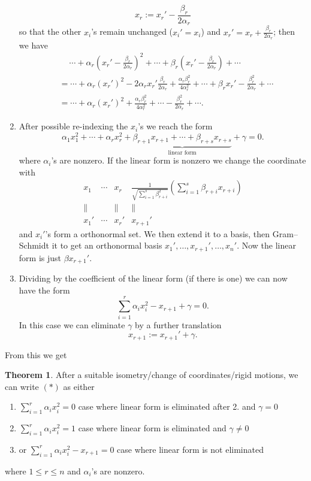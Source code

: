 \documentclass[a4paper]{article}
\theoremstyle{definition}
\newtheorem{thm}[defn]{Theorem}
\begin{document}
\begin{enumerate}
    \[
    x_r:=x_r' - \frac{\beta_r}{2\alpha_r}
    \]
    so that the other $x_i$'s remain unchanged ($x_i'=x_i$) and $x_r'=x_r+\frac{\beta_r}{2\alpha_r}$; then we have
    \[
    \begin{aligned}
    &\quad \ \cdots + \alpha_r \left(x_r' - \frac{\beta_r}{2\alpha_r}\right)^2 + \cdots + \beta_r \left(x_r' - \frac{\beta_r}{2\alpha_r}\right) +\cdots \\
    &= \cdots+\alpha_r \left(x_r'\right)^2 - 2\alpha_r x_r' \frac{\beta_r}{2\alpha_r} + \frac{\alpha_r\beta_r^2}{4\alpha_r^2} + \cdots + \beta_r x_r' - \frac{\beta_r^2}{2\alpha_r} + \cdots \\
    &= \cdots + \alpha_r \left(x_r'\right)^2 + \frac{\alpha_r\beta_r^2}{4\alpha_r^2} + \cdots - \frac{\beta_r^2}{2\alpha_r} + \cdots .
    \end{aligned}
    \]
    \item After possible re-indexing the $x_i$'s we reach the form
    \[
    \alpha_1 x_1^2 + \cdots + \alpha_r x_r^2 + \underbrace{\beta_{r+1} x_{r+1} + \cdots + \beta_{r+s} x_{r+s}}_{\text{linear form}} + \gamma =0.
    \]
    where $\alpha_i$'s are nonzero. If the linear form is nonzero we change the coordinate with
    \[
    \begin{array}{cccc}
        x_1 & \cdots & x_r & \displaystyle \frac{1}{\sqrt{\sum_{i=1}^s \beta_{r+i}^2}} \left(\sum_{i=1}^s \beta_{r+i}x_{r+i} \right) \\
        \| & & \| & \| \\
        x_1' & \cdots & x_r' & x_{r+1}'
    \end{array}
    \]
    and $x_i'$'s form a orthonormal set. We then extend it to a basis, then Gram–Schmidt it to get an orthonormal basis $x_1',\ldots,x_{r+1}',\ldots,x_n'$. Now the linear form is just $\beta x_{r+1}'$.
    \item Dividing by the coefficient of the linear form (if there is one) we can now have the form
    \[
    \sum_{i=1}^r \alpha_i x_i^2 -x_{r+1} + \gamma =0.
    \]
    In this case we can eliminate $\gamma$ by a further translation
    \[
    x_{r+1}:=x_{r+1}'+\gamma .
    \]
\end{enumerate}
From this we get
\begin{thm}
After a suitable isometry/change of coordinates/rigid motions, we can write $(\ast)$ as either
\begin{enumerate}
    \item $\displaystyle \sum_{i=1}^r \alpha_i x_i^2=0$ \qquad case where linear form is eliminated after 2. and $\gamma=0$
    \item $\displaystyle \sum_{i=1}^r \alpha_i x_i^2=1$ \qquad case where linear form is eliminated and $\gamma\neq 0$
    \item or $\displaystyle \sum_{i=1}^r \alpha_i x_i^2 - x_{r+1}=0$ \qquad case where linear form is not eliminated
\end{enumerate}
where $1\leq r\leq n$ and $\alpha_i$'s are nonzero.
\end{thm}
\end{document}
